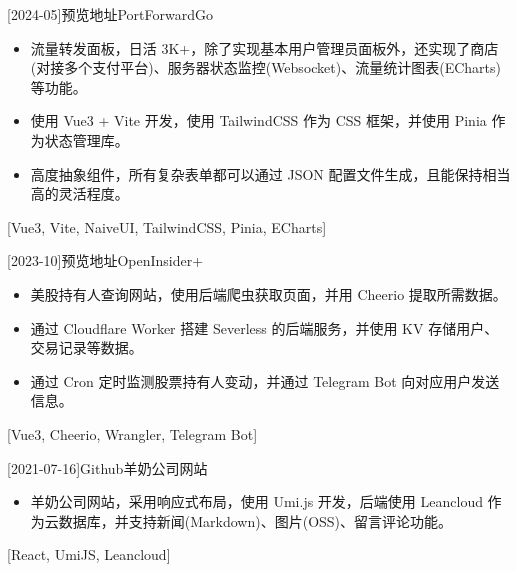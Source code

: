 \documentclass[zh]{resume}
\begin{document}
\begin{projects}
  [2024-05]{预览地址}{}{PortForwardGo}{
    \begin{itemize}
      \item 流量转发面板，日活 3K+，除了实现基本用户管理员面板外，还实现了商店(对接多个支付平台)、服务器状态监控(Websocket)、流量统计图表(ECharts)等功能。
      \item 使用 Vue3 + Vite 开发，使用 TailwindCSS 作为 CSS 框架，并使用 Pinia 作为状态管理库。
      \item 高度抽象组件，所有复杂表单都可以通过 JSON 配置文件生成，且能保持相当高的灵活程度。
    \end{itemize}
  }[Vue3, Vite, NaiveUI, TailwindCSS, Pinia, ECharts]

  \separator{0.5ex}
  [2023-10]{预览地址}{}{OpenInsider+}{
    \begin{itemize}
      \item 美股持有人查询网站，使用后端爬虫获取页面，并用 Cheerio 提取所需数据。
      \item 通过 Cloudflare Worker 搭建 Severless 的后端服务，并使用 KV 存储用户、交易记录等数据。
      \item 通过 Cron 定时监测股票持有人变动，并通过 Telegram Bot 向对应用户发送信息。
    \end{itemize}
  }[Vue3, Cheerio, Wrangler, Telegram Bot]

  \separator{0.5ex}
  [2021-07-16]{Github}{}{羊奶公司网站}{
    \begin{itemize}
      \item 羊奶公司网站，采用响应式布局，使用 Umi.js 开发，后端使用 Leancloud 作为云数据库，并支持新闻(Markdown)、图片(OSS)、留言评论功能。
    \end{itemize}
  }[React, UmiJS, Leancloud]


\end{projects}
\end{document}
